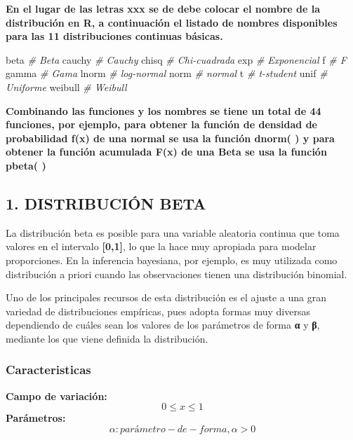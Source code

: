 \documentclass[
]{article}
\newenvironment{Shaded}{\begin{snugshade}}{\end{snugshade}}
\newcommand{\CommentTok}[1]{\textcolor[rgb]{0.56,0.35,0.01}{\textit{#1}}}
\newcommand{\NormalTok}[1]{#1}
\begin{document}
\textbf{En el lugar de las letras xxx se de debe colocar el nombre de la
distribución en R, a continuación el listado de nombres disponibles para
las 11 distribuciones continuas básicas.}

\begin{Shaded}
\begin{Highlighting}[]
\NormalTok{beta     }\CommentTok{\# Beta}
\NormalTok{cauchy   }\CommentTok{\# Cauchy}
\NormalTok{chisq    }\CommentTok{\# Chi{-}cuadrada}
\NormalTok{exp      }\CommentTok{\# Exponencial}
\NormalTok{f        }\CommentTok{\# F}
\NormalTok{gamma    }\CommentTok{\# Gama}
\NormalTok{lnorm    }\CommentTok{\# log{-}normal}
\NormalTok{norm     }\CommentTok{\# normal}
\NormalTok{t        }\CommentTok{\# t{-}student}
\NormalTok{unif     }\CommentTok{\# Uniforme}
\NormalTok{weibull  }\CommentTok{\# Weibull}
\end{Highlighting}
\end{Shaded}

\textbf{Combinando las funciones y los nombres se tiene un total de 44
funciones, por ejemplo, para obtener la función de densidad de
probabilidad f(x) de una normal se usa la función dnorm( ) y para
obtener la función acumulada F(x) de una Beta se usa la función pbeta(
)}

\hypertarget{distribuciuxf3n-beta}{%
\subsection{1. DISTRIBUCIÓN BETA}\label{distribuciuxf3n-beta}}

La distribución beta es posible para una variable aleatoria continua que
toma valores en el intervalo \textbf{{[}0,1{]}}, lo que la hace muy
apropiada para modelar proporciones. En la inferencia bayesiana, por
ejemplo, es muy utilizada como distribución a priori cuando las
observaciones tienen una distribución binomial.

Uno de los principales recursos de esta distribución es el ajuste a una
gran variedad de distribuciones empíricas, pues adopta formas muy
diversas dependiendo de cuáles sean los valores de los parámetros de
forma \textbf{α} y \textbf{β}, mediante los que viene definida la
distribución.

\hypertarget{caracteristicas}{%
\subsubsection{Caracteristicas}\label{caracteristicas}}

\textbf{Campo de variación:} \[0≤x≤1\] \textbf{Parámetros:}
\[α: parámetro -de -forma,α>0\]
\end{document}
